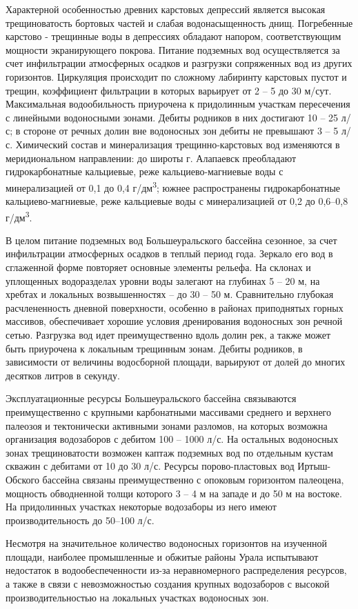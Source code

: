Характерной особенностью древних карстовых депрессий является высокая трещиноватость бортовых частей и слабая водонасыщенность днищ. Погребенные карстово - трещинные воды в депрессиях обладают напором, соответствующим мощности экранирующего покрова. Питание подземных вод осуществляется за счет инфильтрации атмосферных осадков и разгрузки сопряженных вод из других горизонтов. Циркуляция происходит по сложному лабиринту карстовых пустот и трещин, коэффициент фильтрации в которых варьирует от 2 – 5 до 30 м/сут. Максимальная водообильность приурочена к придолинным участкам пересечения с линейными водоносными зонами. Дебиты родников в них достигают 10 – 25 л/с; в стороне от речных долин вне водоносных зон дебиты не превышают 3 – 5 л/с. Химический состав и минерализация трещинно-карстовых вод изменяются в меридиональном направлении: до широты г. Алапаевск преобладают гидрокарбонатные кальциевые, реже кальциево-магниевые воды с минерализацией от 0,1 до 0,4 г/дм\textsuperscript{3}; южнее распространены гидрокарбонатные кальциево-магниевые, реже кальциевые воды с минерализацией от 0,2 до 0,6–0,8 г/дм\textsuperscript{3}.

В целом питание подземных вод Большеуральского бассейна сезонное, за счет инфильтрации атмосферных осадков в теплый период года. Зеркало его вод в сглаженной форме повторяет основные элементы рельефа. На склонах и уплощенных водоразделах уровни воды залегают на глубинах 5 – 20 м, на хребтах и локальных возвышенностях – до 30 – 50 м. Сравнительно глубокая расчлененность дневной поверхности, особенно в районах приподнятых горных массивов, обеспечивает хорошие условия дренирования водоносных зон речной сетью. Разгрузка вод идет преимущественно вдоль долин рек, а также может быть приурочена к локальным трещинным зонам. Дебиты родников, в зависимости от величины водосборной площади, варьируют от долей до многих десятков литров в секунду.

Эксплуатационные ресурсы Большеуральского бассейна связываются преимущественно с крупными карбонатными массивами среднего и верхнего палеозоя и тектонически активными зонами разломов, на которых возможна организация водозаборов с дебитом 100 – 1000 л/с. На остальных водоносных зонах трещиноватости возможен каптаж подземных вод по отдельным кустам скважин с дебитами от 10 до 30 л/с. Ресурсы порово-пластовых вод Иртыш-Обского бассейна связаны преимущественно с опоковым горизонтом палеоцена, мощность обводненной толщи которого 3 – 4 м на западе и до 50 м на востоке. На придолинных участках некоторые водозаборы из него имеют производительность до 50–100 л/с.

Несмотря на значительное количество водоносных горизонтов на изученной площади, наиболее промышленные и обжитые районы Урала испытывают недостаток в водообеспеченности из-за неравномерного распределения ресурсов, а также в связи с невозможностью создания крупных водозаборов с высокой производительностью на локальных участках водоносных зон.
